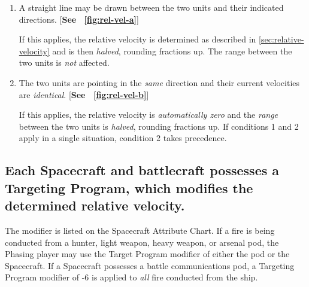 \begin{enumerate}
\item A straight line may be drawn between the two units and their
  indicated directions. [\textbf{See \figurename\ \ref{fig:rel-vel-a}}] 
  
  If this applies, the relative velocity is determined as described in
  \ref{sec:relative-velocity} and is then \emph{halved}, rounding
  fractions up. The range between the two units is \emph{not}
  affected.
\item The two units are pointing in the \emph{same} direction and
  their current velocities are \emph{identical}. [\textbf{See \figurename\ 
  \ref{fig:rel-vel-b}}]
  
  If this applies, the relative velocity is \emph{automatically zero}
  and the \emph{range} between the two units is \emph{halved}, rounding
  fractions up. If conditions 1 and 2 apply in a single situation,
  condition 2 takes precedence.
\end{enumerate}

\begin{figure}[htbp]
  \centering
\end{figure}


\begin{figure}[htbp]
  \centering
\end{figure}


\subsection[Targeting Program And Relative Velocity]{Each Spacecraft
  and battlecraft possesses a Targeting Program, which modifies the
  determined relative  
  velocity.}
\label{sec:targeting-program-rel-vel}



The modifier is listed on the Spacecraft Attribute Chart. If a fire is
being conducted from a hunter, light weapon, heavy weapon, or arsenal
pod, the Phasing player may use the Target Program modifier of either
the pod or the Spacecraft. If a Spacecraft possesses a battle
communications pod, a Targeting Program modifier of -6 is applied to
\emph{all} fire conducted from the ship.

